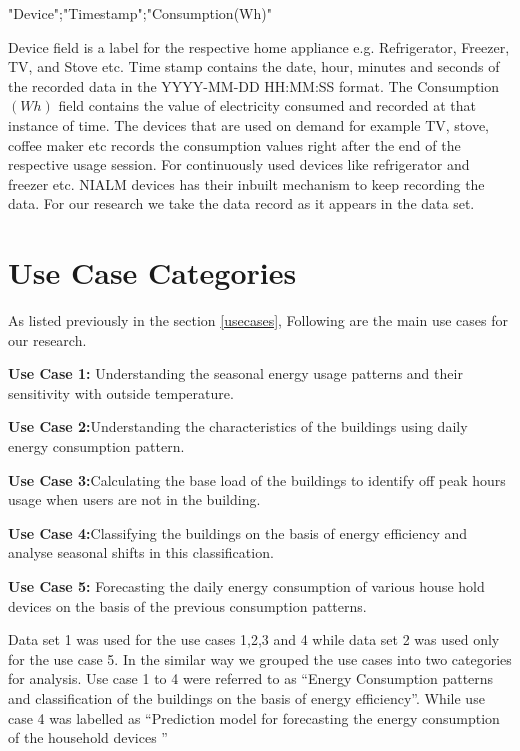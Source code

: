 "Device";"Timestamp";"Consumption(Wh)"

Device field is a label for the respective home appliance e.g. Refrigerator, Freezer, TV, and Stove etc. Time stamp contains the date, hour, minutes and seconds of the recorded data in the  YYYY-MM-DD HH:MM:SS format. The Consumption\((Wh)\) field contains the value of electricity consumed and recorded at that instance of time. The devices that are used on demand for example TV, stove, coffee maker etc records the consumption values right after the end of the respective usage session. For continuously used devices like refrigerator and freezer etc. NIALM devices has their inbuilt mechanism to keep recording the data. For our research we take the data record as it appears in the data set.   

\section{Use Case Categories}

As listed previously in the section \ref{usecases}, Following are the main use cases for our research.

\textbf{Use Case 1:} Understanding the seasonal energy usage patterns and their sensitivity with outside temperature.

\textbf{Use Case 2:}Understanding the characteristics of the buildings using daily energy consumption pattern.

\textbf{Use Case 3:}Calculating the base load of the buildings to identify off peak hours usage when users are not in the building.

\textbf{Use Case 4:}Classifying the buildings on the basis of energy efficiency and analyse seasonal shifts in this classification.

\textbf{Use Case 5:} Forecasting the daily energy consumption of various house hold devices on the basis of the previous consumption patterns.

Data set 1 was used for the use cases 1,2,3 and 4 while data set 2 was used only for the use case 5. In the similar way we grouped the use cases into two categories for analysis. Use case 1 to 4 were referred to as ``Energy Consumption patterns and classification of the buildings on the basis of energy efficiency''. While use case 4 was labelled as ``Prediction model for forecasting  the energy consumption of the household devices ''



